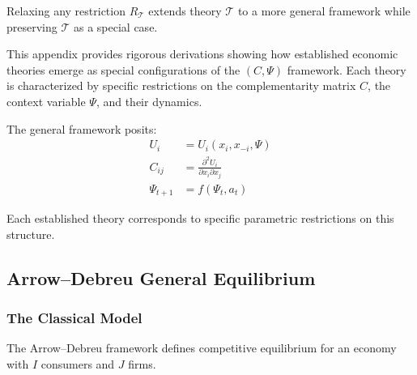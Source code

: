 \begin{axiom}
\label{ax:A-A4}
Relaxing any restriction $R_\mathcal{T}$ extends theory $\mathcal{T}$ to a more
general framework while preserving $\mathcal{T}$ as a special case.
\end{axiom}



This appendix provides rigorous derivations showing how established economic theories
emerge as special configurations of the $(C, \Psi)$ framework.
Each theory is characterized by specific restrictions on the complementarity matrix $C$,
the context variable $\Psi$, and their dynamics.

The general framework posits:
\begin{align}
  U_i &= U_i(x_i, x_{-i}, \Psi) \label{eq:generalutility} \\
  C_{ij} &= \frac{\partial^2 U_i}{\partial x_i \partial x_j} \label{eq:generalcomplementarity} \\
  \Psi_{t+1} &= f(\Psi_t, a_t) \label{eq:generalcontext}
\end{align}

Each established theory corresponds to specific parametric restrictions on this structure.

\subsection{Arrow--Debreu General Equilibrium}
\label{app:arrowdebreu}

\subsubsection{The Classical Model}

The Arrow--Debreu framework \citep{arrowdeb} defines competitive equilibrium
for an economy with $I$ consumers and $J$ firms.

